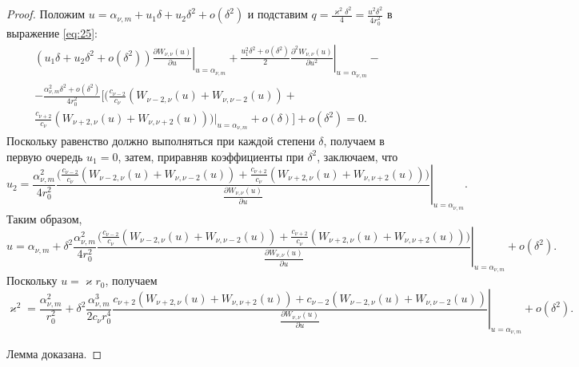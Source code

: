 \begin{proof}
Положим $u = \alpha_{\nu, m} + u_1 \delta + u_2 \delta^2 + o(\delta^2)$ и подставим $q = \frac{\varkappa^2 \delta^2}{4} = \frac{u^2 \delta^2}{4 r_0^2}$ в выражение \eqref{eq:25}:
\begin{multline*}
    (u_1 \delta + u_2 \delta^2 + o(\delta^2)) 
\left.
\frac{\partial W_{\nu, \nu}(u)}{\partial u}
\right|_{u=\alpha_{\nu, m}} + 
    \frac{u_1^2 \delta^2 + o(\delta^2)}{2}
\left.
\frac{\partial^2 W_{\nu, \nu}(u)}{\partial u^2}
\right|_{u=\alpha_{\nu, m}} 
- \\ - \frac{\alpha_{\nu, m}^2 \delta^2 + o(\delta^2)}{4r_0^2}  \bigg[\bigg(    
	\frac{c_{\nu-2}}{c_\nu}
    \left(W_{\nu-2, \nu}(u) + W_{\nu, \nu-2}(u) \right)+ 
\\
	\frac{c_{\nu+2}}{c_\nu}
	\left(
	W_{\nu+2, \nu}(u) + W_{\nu, \nu+2}(u)
	\right)
\left.
\bigg)
\right|_{u=\alpha_{\nu, m}}
+ o(\delta)
\bigg]
 + o(\delta^2) = 0.
 \end{multline*}
Поскольку равенство должно выполняться при каждой степени $\delta$, получаем в первую очередь $u_1 = 0$, затем, приравняв коэффициенты при $\delta^2$, заключаем, что
$$u_2 = \frac{\alpha_{\nu, m}^2}{4r_0^2} 
\left.
\frac{
\bigg(    
	\frac{c_{\nu-2}}{c_\nu}
	\left(
	W_{\nu-2, \nu}(u) + W_{\nu, \nu-2}(u)
	\right)+
	\frac{c_{\nu+2}}{c_\nu}
	\left(
	W_{\nu+2, \nu}(u) + W_{\nu, \nu+2}(u)
	\right)
\bigg)
}{ \frac{\partial W_{\nu,\nu}(u)}{\partial u} }
\right|_{u=\alpha_{\nu, m}}.$$
Таким образом, 
{\small
\[
u = \alpha_{\nu, m} + \delta^2 \frac{\alpha_{\nu, m}^2}{4r_0^2} \left.
\frac{
\bigg(    
	\frac{c_{\nu-2}}{c_\nu}
	\left(
	W_{\nu-2, \nu}(u) + W_{\nu, \nu-2}(u)
	\right)+
	\frac{c_{\nu+2}}{c_\nu}
	\left(
	W_{\nu+2, \nu}(u) + W_{\nu, \nu+2}(u)
	\right)
\bigg)
}{ \frac{\partial W_{\nu,\nu}(u)}{\partial u} }
\right|_{u=\alpha_{\nu, m}} + o(\delta^2). 
\]
}
Поскольку $u = \varkappa r_0$, получаем
{\small
\[
\varkappa^2 = \dfrac{\alpha_{\nu, m}^2}{r_0^2} + \delta^2 \dfrac{\alpha_{\nu, m}^3}{2 c_\nu r_0^4} \left. \frac{
c_{\nu+2} \left( W_{\nu+2, \nu}(u) + W_{\nu, \nu+2}(u) \right) + 
c_{\nu-2} \left( W_{\nu-2, \nu}(u) + W_{\nu, \nu-2}(u) \right)
}{ \frac{\partial W_{\nu,\nu}(u)}{\partial u} }\right|_{u=\alpha_{\nu, m}} + o(\delta^2).
\]
}

Лемма доказана.
\end{proof}
\medskip

